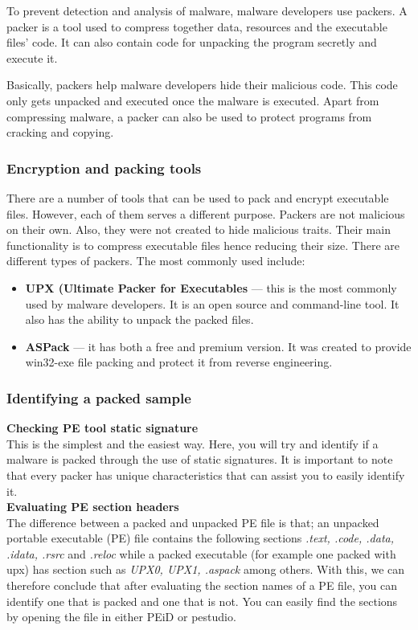 To prevent detection and analysis of malware, malware developers use packers. A packer is a tool used to compress together data, resources and the executable files' code. It can also contain code for unpacking the program secretly and execute it.

Basically, packers help malware developers hide their malicious code. This code only gets unpacked and executed once the malware is executed. Apart from compressing malware, a packer can also be used to protect programs from cracking and copying.

\subsubsection{Encryption and packing tools}
There are a number of tools that can be used to pack and encrypt executable files. However, each of them serves a different purpose. Packers are not malicious on their own. Also, they were not created to hide malicious traits. Their main functionality is to compress executable files hence reducing their size. There are different types of packers. The most commonly used include:\\

\begin{itemize}
    \item \textbf{UPX (Ultimate Packer for Executables} — this is the most commonly used by malware developers. It is an open source and command-line tool. It also has the ability to unpack the packed files.
    \item \textbf{ASPack} — it has both a free and premium version. It was created to provide win32-exe file packing and protect it from reverse engineering.
\end{itemize}

\subsubsection{Identifying a packed sample}

\textbf{Checking PE tool static signature}\\
This is the simplest and the easiest way. Here, you will try and identify if a malware is packed through the use of static signatures. It is important to note that every packer has unique characteristics that can assist you to easily identify it.\\

\textbf{Evaluating PE section headers}\\
The difference between a packed and unpacked PE file is that; an unpacked portable executable (PE) file contains the following sections \textit{.text, .code, .data, .idata, .rsrc} and \textit{.reloc} while a packed executable (for example one packed with upx) has section such as \textit{UPX0, UPX1, .aspack} among others.
With this, we can therefore conclude that after evaluating the section names of a PE file, you can identify one that is packed and one that is not. You can easily find the sections by opening the file in either PEiD or pestudio.\\

